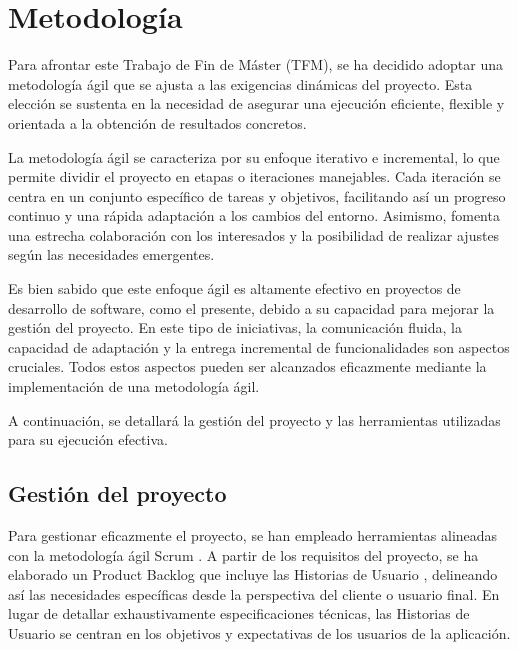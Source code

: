 
\chapter{Metodología}\label{cap:cap4}
Para afrontar este Trabajo de Fin de Máster (TFM), se ha decidido adoptar una metodología ágil que se ajusta a las exigencias dinámicas del proyecto. Esta elección se sustenta en la necesidad de asegurar una ejecución eficiente, flexible y orientada a la obtención de resultados concretos.

\vspace{0.5cm}

La metodología ágil se caracteriza por su enfoque iterativo e incremental, lo que permite dividir el proyecto en etapas o iteraciones manejables. Cada iteración se centra en un conjunto específico de tareas y objetivos, facilitando así un progreso continuo y una rápida adaptación a los cambios del entorno. Asimismo, fomenta una estrecha colaboración con los interesados y la posibilidad de realizar ajustes según las necesidades emergentes.

\vspace{0.5cm}

Es bien sabido que este enfoque ágil es altamente efectivo en proyectos de desarrollo de software, como el presente, debido a su capacidad para mejorar la gestión del proyecto. En este tipo de iniciativas, la comunicación fluida, la capacidad de adaptación y la entrega incremental de funcionalidades son aspectos cruciales. Todos estos aspectos pueden ser alcanzados eficazmente mediante la implementación de una metodología ágil.

\vspace{0.5cm}

A continuación, se detallará la gestión del proyecto y las herramientas utilizadas para su ejecución efectiva.

\section{Gestión del proyecto}\label{sec:apartado}

Para gestionar eficazmente el proyecto, se han empleado herramientas alineadas con la metodología ágil Scrum \cite{schwaber2017}. A partir de los requisitos del proyecto, se ha elaborado un Product Backlog que incluye las Historias de Usuario \cite{cohn2004}, delineando así las necesidades específicas desde la perspectiva del cliente o usuario final. En lugar de detallar exhaustivamente especificaciones técnicas, las Historias de Usuario se centran en los objetivos y expectativas de los usuarios de la aplicación.

